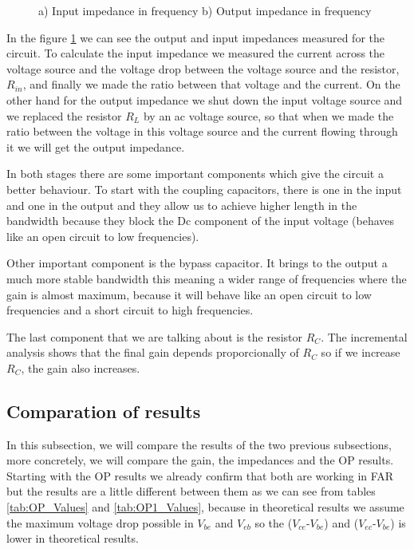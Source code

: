 \begin{figure}[h!]
            \centering
            \caption{a) Input impedance in frequency b) Output impedance in frequency}
            \label{fig:3}
\end{figure}


In the figure \ref{fig:3} we can see the output and input impedances measured for the circuit. To calculate the input impedance we measured the current across the voltage 
source and the voltage drop between the voltage source and the resistor, $R_{in}$, and finally we made the ratio between that voltage and the current. On the other hand for
the output impedance we shut down the input voltage source and we replaced the resistor $R_{L}$ by an ac voltage source, so that when we made the ratio between the voltage in 
this voltage source and the current flowing through it we will get the output impedance.     

\newpage

In both stages there are some important components which give the circuit a better behaviour. To start with the coupling capacitors, there is one in the input and one in
the output and they allow us to achieve higher length in the bandwidth because they block the Dc component of the input voltage (behaves like an open circuit to low
frequencies). 

Other important component is the bypass capacitor. It brings to the output a much more stable bandwidth this meaning a wider range of frequencies where the gain is almost 
maximum, because it will behave like an open circuit to low frequencies and a short circuit to high frequencies. 

The last component that we are talking about is the resistor $R_{C}$. The incremental analysis shows that the final gain depends proporcionally of $R_{C}$ so if we 
increase $R_{C}$, the gain also increases.


\subsection{Comparation of results} %
\label{sub:comp}

In this subsection, we will compare the results of the two previous subsections, more concretely, we will compare the gain, the impedances and the OP results.
Starting with the OP results we already confirm that both are working in FAR but the results are a little different between them as we can see from tables \ref{tab:OP_Values}
and \ref{tab:OP1_Values}, because in theoretical results we assume the maximum voltage drop possible in $V_{be}$ and $V_{eb}$ so the ($V_{ce}$-$V_{be}$) and ($V_{ec}$-$V_{be}$) is 
lower in theoretical results.

